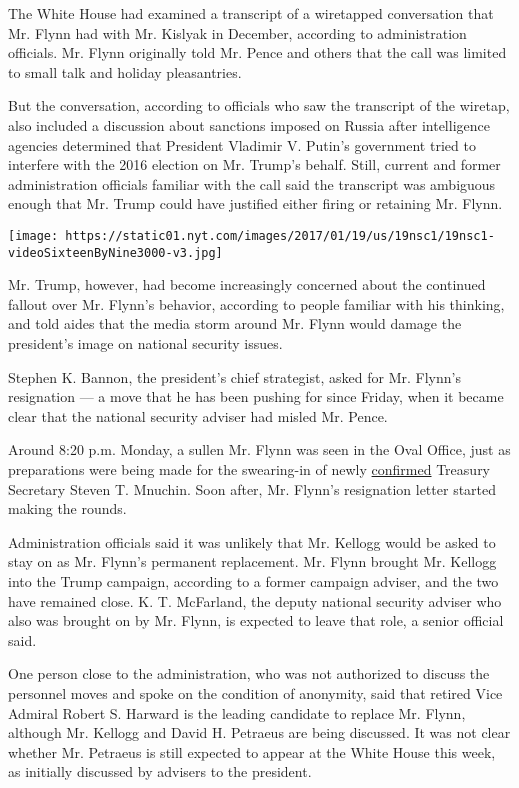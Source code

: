 The White House had examined a transcript of a wiretapped conversation
that Mr. Flynn had with Mr. Kislyak in December, according to
administration officials. Mr. Flynn originally told Mr. Pence and others
that the call was limited to small talk and holiday pleasantries.

But the conversation, according to officials who saw the transcript of
the wiretap, also included a discussion about sanctions imposed on
Russia after intelligence agencies determined that President Vladimir V.
Putin's government tried to interfere with the 2016 election on Mr.
Trump's behalf. Still, current and former administration officials
familiar with the call said the transcript was ambiguous enough that Mr.
Trump could have justified either firing or retaining Mr. Flynn.

\texttt{[image: https://static01.nyt.com/images/2017/01/19/us/19nsc1/19nsc1-videoSixteenByNine3000-v3.jpg]}

Mr. Trump, however, had become increasingly concerned about the
continued fallout over Mr. Flynn's behavior, according to people
familiar with his thinking, and told aides that the media storm around
Mr. Flynn would damage the president's image on national security
issues.

Stephen K. Bannon, the president's chief strategist, asked for Mr.
Flynn's resignation --- a move that he has been pushing for since
Friday, when it became clear that the national security adviser had
misled Mr. Pence.

Around 8:20 p.m. Monday, a sullen Mr. Flynn was seen in the Oval Office,
just as preparations were being made for the swearing-in of newly
\href{https://www.nytimes.com/2017/02/13/us/politics/steven-mnuchin-confirmed-treasury-secretary.html}{confirmed}
Treasury Secretary Steven T. Mnuchin. Soon after, Mr. Flynn's
resignation letter started making the rounds.

Administration officials said it was unlikely that Mr. Kellogg would be
asked to stay on as Mr. Flynn's permanent replacement. Mr. Flynn brought
Mr. Kellogg into the Trump campaign, according to a former campaign
adviser, and the two have remained close. K. T. McFarland, the deputy
national security adviser who also was brought on by Mr. Flynn, is
expected to leave that role, a senior official said.

One person close to the administration, who was not authorized to
discuss the personnel moves and spoke on the condition of anonymity,
said that retired Vice Admiral Robert S. Harward is the leading
candidate to replace Mr. Flynn, although Mr. Kellogg and David H.
Petraeus are being discussed. It was not clear whether Mr. Petraeus is
still expected to appear at the White House this week, as initially
discussed by advisers to the president.

